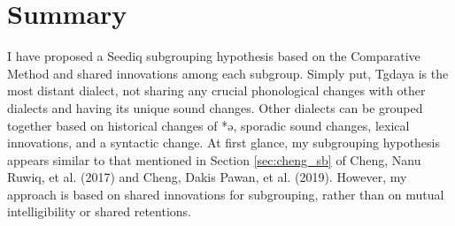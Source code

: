 \section{Summary}

I have proposed a Seediq subgrouping hypothesis based on the Comparative Method and shared innovations among each subgroup. Simply put, Tgdaya is the most distant dialect, not sharing any crucial phonological changes with other dialects and having its unique sound changes. Other dialects can be grouped together based on historical changes of *ə, sporadic sound changes, lexical innovations, and a syntactic change. At first glance, my subgrouping hypothesis appears similar to that mentioned in Section \ref{sec:cheng_sb} of Cheng, Nanu Ruwiq, et al. (2017) and Cheng, Dakis Pawan, et al. (2019). However, my approach is based on shared innovations for subgrouping, rather than on mutual intelligibility or shared retentions.